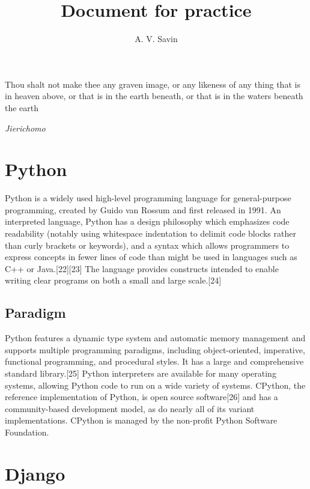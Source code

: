 \documentclass{article}
\begin{document}
\tableofcontents

\title{Document for practice}
\author{A. V. Savin}
\date{}
\maketitle

\begin{flushright}
Thou shalt not make thee any graven image, or any likeness of any thing that is in heaven above, or that is in the earth beneath, or that is in the waters beneath the earth


\textit{Jierichomo}
\end{flushright}

\section{Python}

{\setlength{\parindent}{1cm}}Python is a widely used high-level programming language for general-purpose programming, created by Guido van Rossum and first released in 1991. An interpreted language, Python has a design philosophy which emphasizes code readability (notably using whitespace indentation to delimit code blocks rather than curly brackets or keywords), and a syntax which allows programmers to express concepts in fewer lines of code than might be used in languages such as C++ or Java.[22][23] The language provides constructs intended to enable writing clear programs on both a small and large scale.[24]

\subsection[Some facts about Python]{Paradigm}{\setlength{\parindent}{1cm}}

Python features a dynamic type system and automatic memory management and supports multiple programming paradigms, including object-oriented, imperative, functional programming, and procedural styles. It has a large and comprehensive standard library.[25]
{\setlength{\parindent}{1cm}}
Python interpreters are available for many operating systems, allowing Python code to run on a wide variety of systems. CPython, the reference implementation of Python, is open source software[26] and has a community-based development model, as do nearly all of its variant implementations. CPython is managed by the non-profit Python Software Foundation.

\section{Django}{\setlength{\parindent}{1cm}}
\end{document}
